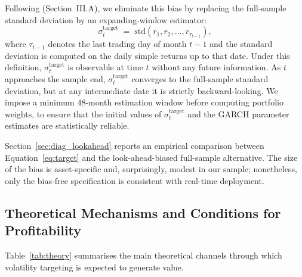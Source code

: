\documentclass[12pt, a4paper]{article}
\newcommand{\stgt}{\sigma^{\mathrm{target}}}
\begin{document}
Following \citet{Bongaerts2020} (Section~III.A), we eliminate this bias by replacing the
full-sample standard deviation by an expanding-window estimator:
\begin{equation}
  \stgt_t \;=\; \mathrm{std}\!\left(r_1, r_2, \ldots, r_{\tau_{t-1}}\right),
  \label{eq:target}
\end{equation}
where $\tau_{t-1}$ denotes the last trading day of month $t-1$ and the standard deviation
is computed on the daily simple returns up to that date. Under this definition,
$\stgt_t$ is observable at time $t$ without any future information. As $t$ approaches the
sample end, $\stgt_t$ converges to the full-sample standard deviation, but at any
intermediate date it is strictly backward-looking. We impose a minimum 48-month estimation
window before computing portfolio weights, to ensure that the initial values of
$\stgt_t$ and the GARCH parameter estimates are statistically reliable.

Section~\ref{sec:diag_lookahead} reports an empirical comparison between
Equation~\eqref{eq:target} and the look-ahead-biased full-sample alternative. The size of
the bias is asset-specific and, surprisingly, modest in our sample; nonetheless, only the
bias-free specification is consistent with real-time deployment.

\subsection{Theoretical Mechanisms and Conditions for Profitability}

Table~\ref{tab:theory} summarises the main theoretical channels through which volatility
targeting is expected to generate value.
\end{document}
